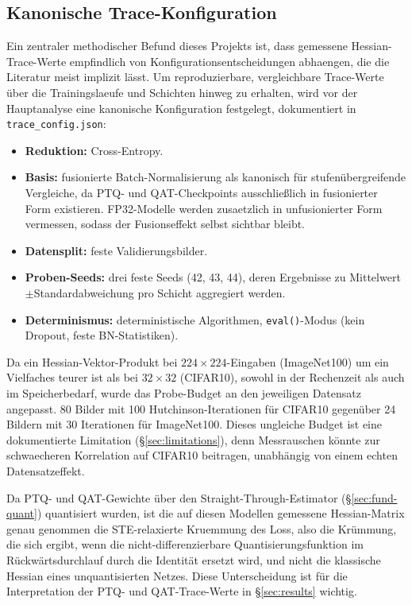 \subsection{Kanonische Trace-Konfiguration}
\label{sec:canonical-config}

Ein zentraler methodischer Befund dieses Projekts ist, dass gemessene Hessian-Trace-Werte empfindlich von Konfigurationsentscheidungen abhaengen, die die Literatur meist implizit lässt. Um reproduzierbare, vergleichbare Trace-Werte über die Trainingslaeufe und Schichten hinweg zu erhalten, wird vor der Hauptanalyse eine kanonische Konfiguration festgelegt, dokumentiert in \texttt{trace\_config.json}:

\begin{itemize}
\item \textbf{Reduktion:} Cross-Entropy.
\item \textbf{Basis:} fusionierte Batch-Normalisierung \citep{ioffe_batchnorm_2015} als kanonisch für stufenübergreifende Vergleiche, da PTQ- und QAT-Checkpoints ausschließlich in fusionierter Form existieren. FP32-Modelle werden zusaetzlich in unfusionierter Form vermessen, sodass der Fusionseffekt selbst sichtbar bleibt.
\item \textbf{Datensplit:} feste Validierungsbilder.
\item \textbf{Proben-Seeds:} drei feste Seeds (42, 43, 44), deren Ergebnisse zu Mittelwert$\pm$Standardabweichung pro Schicht aggregiert werden.
\item \textbf{Determinismus:} deterministische Algorithmen, \texttt{eval()}-Modus (kein Dropout, feste BN-Statistiken).
\end{itemize}

Da ein Hessian-Vektor-Produkt bei $224\times224$-Eingaben (ImageNet100) um ein Vielfaches teurer ist als bei $32\times32$ (CIFAR10), sowohl in der Rechenzeit als auch im Speicherbedarf, wurde das Probe-Budget an den jeweiligen Datensatz angepasst. 80 Bilder mit 100 Hutchinson-Iterationen für CIFAR10 gegenüber 24 Bildern mit 30 Iterationen für ImageNet100. Dieses ungleiche Budget ist eine dokumentierte Limitation (\S\ref{sec:limitations}), denn Messrauschen könnte zur schwaecheren Korrelation auf CIFAR10 beitragen, unabhängig von einem echten Datensatzeffekt.
\par\medskip

Da PTQ- und QAT-Gewichte über den Straight-Through-Estimator (\S\ref{sec:fund-quant}) quantisiert wurden, ist die auf diesen Modellen gemessene Hessian-Matrix genau genommen die STE-relaxierte Kruemmung des Loss, also die Krümmung, die sich ergibt, wenn die nicht-differenzierbare Quantisierungsfunktion im Rückwärtsdurchlauf durch die Identität ersetzt wird, und nicht die klassische Hessian eines unquantisierten Netzes. Diese Unterscheidung ist für die Interpretation der PTQ- und QAT-Trace-Werte in \S\ref{sec:results} wichtig.

